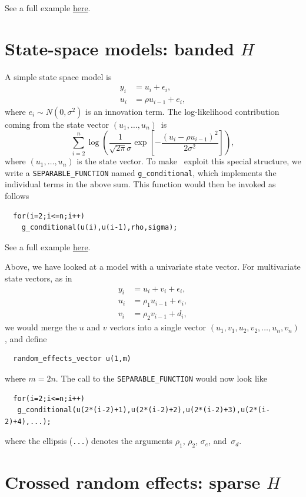 \documentclass{admbmanual}
\begin{document}
See a full example
\href{http://www.otter-rsch.com/admbre/examples/weights/weights.html}{here}.

\section{State-space models: banded $H$}
\label{sec:state-space}

A simple state space model is
\begin{align*}
  y_i &= u_i + \epsilon_i,\\
  u_i &= \rho u_{i-1} + e_i,
\end{align*}
where $e_i\sim N(0,\sigma^2)$ is an innovation term. The log-likelihood
contribution coming from the state vector $(u_1,\ldots,u_n)$~is
\[
  \sum_{i=2}^n \log\left(\frac{1}{\sqrt{2\pi }\sigma }
    \exp\left[-\frac{(u_{i}-\rho u_{i-1})^{2}}{2\sigma^2}\right]\right),
\]
where $(u_1,\ldots,u_n)$ is the state vector. To make \scAR\ exploit this
special structure, we write a \texttt{SEPARABLE\_FUNCTION} named
\texttt{g\_conditional}, which implements the individual terms in the above sum.
This function would then be invoked as follows
\begin{lstlisting}
  for(i=2;i<=n;i++)
    g_conditional(u(i),u(i-1),rho,sigma);
\end{lstlisting}
See a full example
\href{http://www.otter-rsch.com/admbre/examples/polio/polio.html}{here}.

Above, we have looked at a model with a univariate state vector. For
multivariate state vectors, as in
\begin{align*}
  y_i &= u_i + v_i +\epsilon_i,\\
  u_i &= \rho_1 u_{i-1} + e_i,\\
  v_i &= \rho_2 v_{i-1} + d_i,
\end{align*}
we would merge the $u$ and $v$ vectors into a single vector
$(u_1,v_1,u_2,v_2,\ldots,u_n,v_n)$, and define
\begin{lstlisting}
  random_effects_vector u(1,m)
\end{lstlisting}
where $m=2n$. The call to the \texttt{SEPARABLE\_FUNCTION} would now look like
\begin{lstlisting}
  for(i=2;i<=n;i++)
   g_conditional(u(2*(i-2)+1),u(2*(i-2)+2),u(2*(i-2)+3),u(2*(i-2)+4),...);
\end{lstlisting}
where the ellipsis (\texttt{...}) denotes the arguments $\rho_1$, $\rho_2$,
$\sigma_e$, and~$\sigma_d$.

\section{Crossed random effects: sparse $H$}
\end{document}
